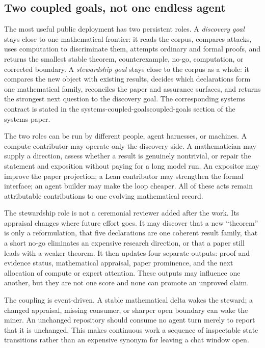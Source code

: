 \documentclass[10pt]{article}
\begin{document}
\subsection*{Two coupled goals, not one endless agent}

The most useful public deployment has two persistent roles.  A
\emph{discovery goal} stays close to one mathematical frontier: it reads the
corpus, compares attacks, uses computation to discriminate them, attempts
ordinary and formal proofs, and returns the smallest stable theorem,
counterexample, no-go, computation, or corrected boundary.  A
\emph{stewardship goal} stays close to the corpus as a whole: it compares the
new object with existing results, decides which declarations form one
mathematical family, reconciles the paper and assurance surfaces, and returns
the strongest next question to the discovery goal.  The corresponding systems
contract is stated in the %
{systems-coupled-goals}{coupled-goals section of the systems paper}.

The two roles can be run by different people, agent harnesses, or machines.
A compute contributor may operate only the discovery side.  A mathematician
may supply a direction, assess whether a result is genuinely nontrivial, or
repair the statement and exposition without paying for a long model run.  An
expositor may improve the paper projection; a Lean contributor may strengthen
the formal interface; an agent builder may make the loop cheaper.  All of
these acts remain attributable contributions to one evolving mathematical
record.

The stewardship role is not a ceremonial reviewer added after the work.  Its
appraisal changes where future effort goes.  It may discover that a new
``theorem'' is only a reformulation, that five declarations are one coherent
result family, that a short no-go eliminates an expensive research direction,
or that a paper still leads with a weaker theorem.  It then updates four
separate outputs: proof and evidence status, mathematical appraisal, paper
prominence, and the next allocation of compute or expert attention.  These
outputs may influence one another, but they are not one score and none can
promote an unproved claim.

The coupling is event-driven.  A stable mathematical delta wakes the steward;
a changed appraisal, missing consumer, or sharper open boundary can wake the
miner.  An unchanged repository should consume no agent turn merely to report
that it is unchanged.  This makes continuous work a sequence of inspectable
state transitions rather than an expensive synonym for leaving a chat window
open.
\end{document}
